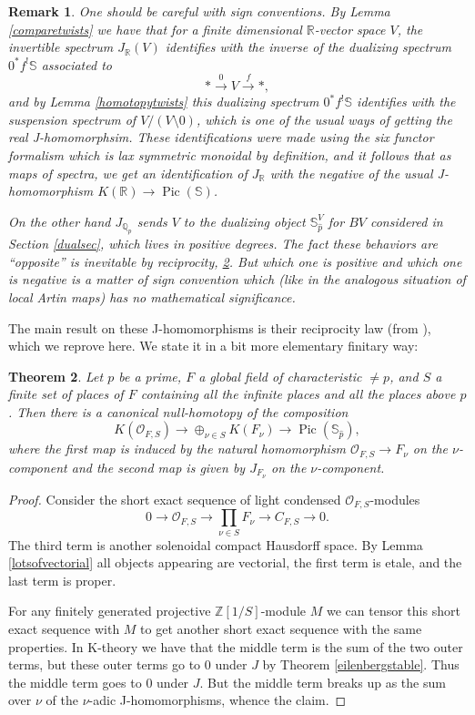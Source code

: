 \documentclass[12pt]{article}
\newtheorem{theorem}{Theorem}[section]
\newtheorem{remark}[theorem]{Remark}
\newcommand{\on}{\operatorname}
\newcommand{\mbb}{\mathbb}
\newcommand{\wh}{\widehat}
\begin{document}
\begin{remark}
One should be careful with sign conventions.  By Lemma \ref{comparetwists} we have that for a finite dimensional $\mbb{R}$-vector space $V$, the invertible spectrum $J_\mbb{R}(V)$ identifies with the \emph{inverse} of the dualizing spectrum $0^\ast f^!\mbb{S}$ associated to
$$\ast\overset{0}{\to} V\overset{f}{\to}\ast,$$
and by Lemma \ref{homotopytwists} this dualizing spectrum $0^\ast f^!\mbb{S}$ identifies with the suspension spectrum of $V/(V\setminus 0)$, which is one of the usual ways of getting the real J-homomorphsim.  These identifications were made using the six functor formalism which is lax symmetric monoidal by definition, and it follows that as maps of spectra, we get an identification of $J_\mbb{R}$ with the \emph{negative} of the usual J-homomorphism $K(\mbb{R})\to\on{Pic}(\mbb{S})$.

On the other hand $J_{\mbb{Q}_p}$ sends $V$ to the dualizing object $\mbb{S}_{\wh{p}}^V$ for $BV$ considered in Section \ref{dualsec}, which lives in positive degrees.  The fact these behaviors are ``opposite'' is inevitable by reciprocity, \ref{reciprocity}.  But which one is positive and which one is negative is a matter of sign convention which (like in the analogous situation of local Artin maps) has no mathematical significance.
\end{remark}

The main result on these J-homomorphisms is their reciprocity law (from \cite{ClausenJ}), which we reprove here.  We state it in a bit more elementary finitary way:

\begin{theorem}\label{reciprocity}
Let $p$ be a prime, $F$ a global field of characteristic $\neq p$, and $S$ a finite set of places of $F$ containing all the infinite places and all the places above $p$.  Then there is a canonical null-homotopy of the composition
$$K(\mathcal{O}_{F,S}) \to \oplus_{\nu \in S}K(F_\nu)\to \on{Pic}(\mbb{S}_{\wh{p}}),$$
where the first map is induced by the natural homomorphism $\mathcal{O}_{F,S}\to F_\nu$ on the $\nu$-component and the second map is given by $J_{F_\nu}$ on the $\nu$-component.
\end{theorem}
\begin{proof}
Consider the short exact sequence of light condensed $\mathcal{O}_{F,S}$-modules
$$0\to\mathcal{O}_{F,S} \to \prod_{\nu\in S}F_\nu \to C_{F,S}\to 0.$$
The third term is another solenoidal compact Hausdorff space.  By Lemma \ref{lotsofvectorial} all objects appearing are vectorial, the first term is etale, and the last term is proper.

For any finitely generated projective $\mbb{Z}[1/S]$-module $M$ we can tensor this short exact sequence with $M$ to get another short exact sequence with the same properties.  In K-theory we have that the middle term is the sum of the two outer terms, but these outer terms go to $0$ under $J$ by Theorem \ref{eilenbergstable}.  Thus the middle term goes to $0$ under $J$.  But the middle term breaks up as the sum over $\nu$ of the $\nu$-adic J-homomorphisms, whence the claim.\end{proof}
\end{document}
